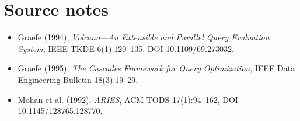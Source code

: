 \chapter*{Source notes}
\begin{itemize}\item Graefe (1994), \emph{Volcano---An Extensible and Parallel Query Evaluation System}, IEEE TKDE 6(1):120--135, DOI 10.1109/69.273032.\item Graefe (1995), \emph{The Cascades Framework for Query Optimization}, IEEE Data Engineering Bulletin 18(3):19--29.\item Mohan et al. (1992), \emph{ARIES}, ACM TODS 17(1):94--162, DOI 10.1145/128765.128770.\end{itemize}

